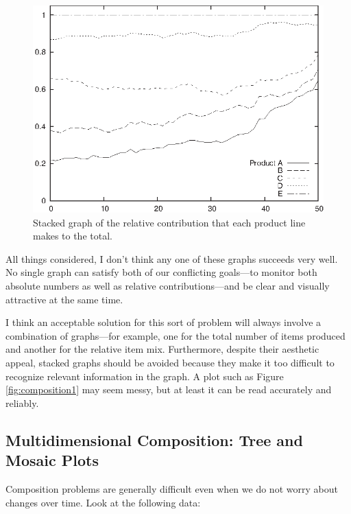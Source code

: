 \begin{figure}
  \centerline{\includegraphics{img/composition3}}
  \caption{Stacked graph of the relative contribution that each
    product line makes to the total.}
  \label{fig:composition3}\vspace*{-6pt}
\end{figure}

All things considered, I don't think any one of these graphs succeeds
very well. No single graph can satisfy both of our conflicting
goals---to monitor both absolute numbers as well as relative
contributions---and be clear and visually attractive at the same time.

I think an acceptable solution for this sort of problem will always
involve a combination of graphs---for example, one for the total
number of items produced and another for the relative item mix.
Furthermore, despite their aesthetic appeal, stacked graphs should be
avoided because they make it too difficult to recognize relevant
information in the graph. A plot such as Figure \ref{fig:composition1}
may seem messy, but at least it can be read accurately and reliably.

\subsection{Multidimensional Composition: Tree and Mosaic Plots}


Composition problems are generally difficult even when we do not worry
about changes over time. Look at the following data:

